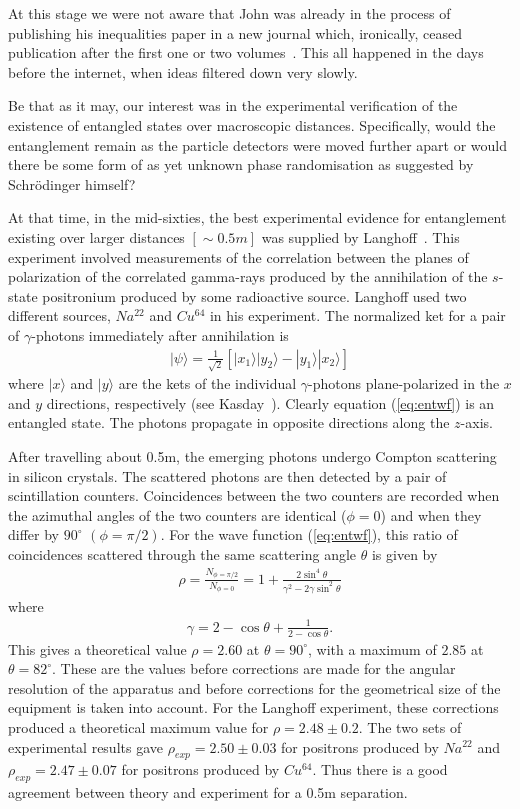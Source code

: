 \documentclass[12pt]{article}
\begin{document}
At this stage we were not aware that John was already in the process of publishing his inequalities paper in a new journal which, ironically, ceased publication after the first one or two volumes~\cite{jb64}.
This all happened in the days before the internet, when ideas filtered down very slowly. 

Be that as it may, our interest was in the experimental verification of the existence of entangled states over macroscopic distances.  Specifically, would the entanglement remain as the particle detectors were moved further apart or would there be some form of as yet unknown phase randomisation as suggested by Schr\"{o}dinger himself? 

At that time, in the mid-sixties, the best experimental evidence for entanglement existing over larger distances $[\sim 0.5m]$ was supplied by Langhoff~\cite{hl60}.
This experiment involved measurements of the correlation between the planes of polarization of the correlated gamma-rays produced by the annihilation of the $s$-state positronium produced by some radioactive source.  Langhoff used two different sources, $Na^{22}$ and $Cu^{64}$ in his experiment. The normalized ket for a pair of $\gamma$-photons immediately after annihilation is
\begin{eqnarray}
|\psi\rangle=\frac{1}{\sqrt 2}\left [ |x_1\rangle|y_2\rangle- |y_1\rangle|x_2\rangle\right]		\label{eq:entwf}
\end{eqnarray}
where $|x\rangle$ and $|y\rangle$ are the kets of the individual $\gamma$-photons plane-polarized in the $x$ and $y$ directions, respectively (see Kasday~\cite{lk71}).   Clearly equation (\ref{eq:entwf})  is an entangled state.  The photons propagate in opposite directions along the $z$-axis.


After travelling about 0.5m, the emerging photons undergo Compton scattering in silicon crystals.  The scattered photons are then detected by a pair of scintillation counters.  Coincidences  between the two counters are recorded when the azimuthal angles of the two counters are identical ($\phi=0$) and when they differ by $90^{\circ}$ $(\phi=\pi/2)$.  For the wave function (\ref{eq:entwf}), this ratio of coincidences scattered through the same scattering angle $\theta$ is given by 
\begin{eqnarray}
\rho=\frac{N_{\phi=\pi/2}}{N_{\phi=0}}=1+\frac{2\sin^4\theta}{\gamma^2-2\gamma\sin^2\theta}	\label{eq:anisot}
\end{eqnarray}
where
\begin{eqnarray*}
\gamma=2-\cos\theta+\frac{1}{2-\cos\theta}.
\end{eqnarray*}
This gives a theoretical value $\rho=2.60$ at $\theta=90^{\circ}$, with a maximum of $2.85$ at $\theta=82^{\circ}$.  These are the values before corrections are made for the angular resolution of the apparatus and before corrections for the geometrical size of the equipment is taken into account. For the Langhoff experiment, these corrections produced a theoretical maximum value for $\rho=2.48\pm0.2$.  The two sets of experimental results gave $\rho_{exp}=2.50\pm0.03$ for positrons produced by $Na^{22}$ and $\rho_{exp}=2.47\pm0.07$ for positrons produced by $Cu^{64}$.  Thus there is a good agreement between theory and experiment for a 0.5m separation. 
\end{document}
